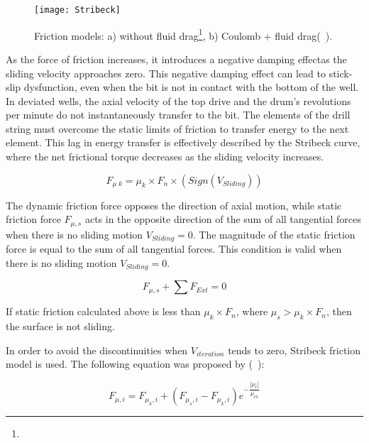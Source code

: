 \begin{figure}
  \centering
  \texttt{[image: Stribeck]}
  \caption[Comparison of friction models]{Friction models: a) without fluid drag\footnote{}, b) Coulomb + fluid drag\footnotemark[\value{footnote}] (~\cite{ref:cayeux2020a}). }
  \label{Friction models}
\end{figure}

As the force of friction increases, it introduces a negative damping effect\needsclarification[How so?]as the sliding velocity approaches zero. This negative damping effect can lead to stick-slip dysfunction, even when the bit is not in contact with the bottom of the well. In deviated wells, the axial velocity of the top drive and the drum's revolutions per minute do not instantaneously transfer to the bit. The elements of the drill string must overcome the static limits of friction to transfer energy to the next element. This lag in energy transfer is effectively described by the Stribeck curve, where the net frictional torque decreases as the sliding velocity increases.

\begin{equation}\label{dyanmic_force}
  F_{\mu\; k} = \mu_{k}\times F_{n} \times (Sign(V_{Sliding}))
\end{equation}

The dynamic friction force opposes the direction of axial motion, while static friction force $F_{\mu,s}$ acts in the opposite direction of the sum of all tangential forces when there is no sliding motion $V_{Sliding}=0$. The magnitude of the static friction force is equal to the sum of all tangential forces. This condition is valid when there is no sliding motion $V_{Sliding}=0$.

\begin{equation}\label{zero}
  F_{\mu,s} + \sum F_{Ext} = 0
\end{equation}

If static friction calculated above is less than $\mu_{k}\times F_{n}$, where $\mu_{s} > \mu_{k}\times F_{n}$, then the surface is not sliding.

In order to avoid the discontinuities when $V_{iteration}$ tends to zero, Stribeck friction model is used. The following equation was proposed by (~\cite{ref:tustin1947a}):

\begin{equation}\label{Stribeck velocity}
  F_{\mu,i} = F_{\mu_{k},i} + (F_{\mu_{s},i} - F_{\mu_{k},i})e^{-\dfrac{|\nu_{i}|}{\nu_{cs}}}
\end{equation} 

